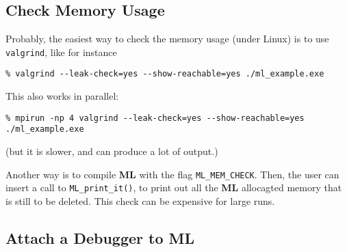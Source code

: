 \documentclass[10pt,letter,relax]{SANDreport}
\newcommand{\ML}     {{\bf ML }}
\begin{document}
\subsection{Check Memory Usage}

Probably, the easiest way to check the memory usage (under Linux) is to use
\verb!valgrind!, like for instance
\begin{verbatim}
% valgrind --leak-check=yes --show-reachable=yes ./ml_example.exe
\end{verbatim}
This also works in parallel:
\begin{verbatim}
% mpirun -np 4 valgrind --leak-check=yes --show-reachable=yes ./ml_example.exe
\end{verbatim}
(but it is slower, and can produce a lot of output.)

Another way is to compile \ML with the flag \verb!ML_MEM_CHECK!. Then,
the user can insert a call to \verb!ML_print_it()!, to print out all the
\ML allocagted memory that is still to be deleted. This check can be
expensive for large runs.

\subsection{Attach a Debugger to ML}
\end{document}
